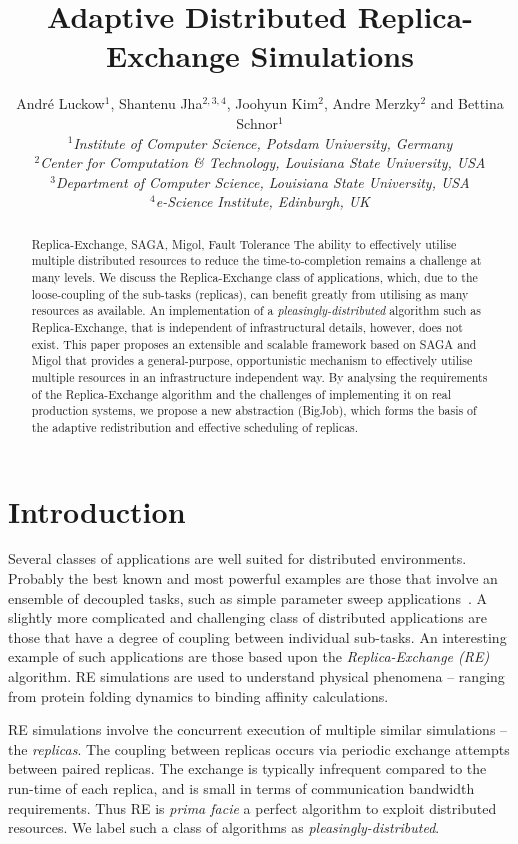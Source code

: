 \documentclass{rspublic}
\title[Adaptive Distributed Replica-Exchange Simulations]{Adaptive Distributed
  Replica-Exchange Simulations}
\author[Luckow, Jha, Kim, Merzky, Schnor]{
  Andr\'e Luckow$^{1}$, Shantenu Jha$^{2,3,4}$, Joohyun Kim$^{2}$, Andre Merzky$^{2}$ and Bettina Schnor$^{1}$\\
  \small{\emph{$^{1}$Institute of Computer Science, Potsdam University, Germany}}\\
  \small{\emph{$^{2}$Center for Computation \& Technology, Louisiana State University, USA}}\\
  \small{\emph{$^{3}$Department of Computer Science, Louisiana State
      University, USA}}\\
  \small{\emph{$^{4}$e-Science Institute, Edinburgh, UK}}\\
}
\begin{document}
 


\maketitle    

\begin{abstract}{Replica-Exchange, SAGA, Migol, Fault Tolerance}  
  The ability to effectively utilise multiple distributed resources to
  reduce the time-to-com\-ple\-tion remains a challenge at many levels.
  We discuss the Replica-Exchange class of applications, which, 
  due to the loose-coupling of the sub-tasks (replicas),
  can benefit greatly from utilising as many resources as available.
  An implementation of a {\it pleasingly-distributed} algorithm such
  as Replica-Exchange, that is independent of infrastructural details,
  however, does not exist.  This paper proposes an extensible and
  scalable framework based on SAGA and Migol that provides a
  general-purpose, opportunistic mechanism to effectively utilise
  multiple resources in an infrastructure independent way. By
  analysing the requirements of the Replica-Exchange algorithm and the
  challenges of implementing it on real production systems, we propose
  a new abstraction (BigJob), which forms the basis of the adaptive
  redistribution and effective scheduling
  of replicas.
\end{abstract}

\section{Introduction}

Several classes of applications are well suited for distributed
environments. Probably the best known and most powerful examples are
those that involve an ensemble of decoupled tasks, such as simple
parameter sweep applications~\citep{1239909}.  A slightly more
complicated and challenging class of distributed applications are
those that have a degree of coupling between individual sub-tasks.  An
interesting example of such applications are those based upon the
\emph{Replica-Exchange (RE)}~\citep{hansmann,Sugita:1999rm} algorithm.
RE simulations are used to understand physical phenomena -- ranging
from protein folding dynamics to binding affinity calculations.

RE simulations involve the concurrent execution of multiple similar
simulations -- the \emph{replicas}. The coupling between replicas
occurs via periodic exchange attempts between paired replicas. The
exchange is typically infrequent compared to the run-time of each
replica, and is small in terms of communication bandwidth
requirements. Thus RE is {\it prima facie} a perfect algorithm to
exploit distributed resources. We label such a class of algorithms as
{\it pleasingly-distributed}.
\end{document}
